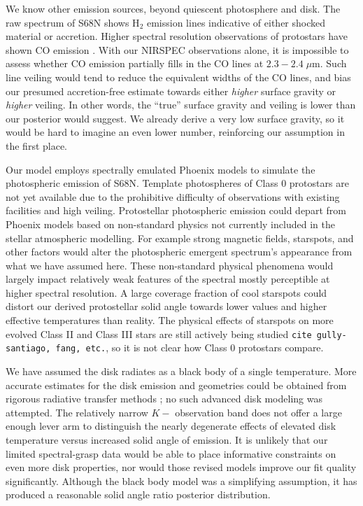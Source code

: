 \documentclass[twocolumn]{emulateapj}%
\begin{document}
We know other emission sources, beyond quiescent photosphere and disk.  The raw spectrum of S68N shows H$_2$ emission lines indicative of either shocked material or accretion.  Higher spectral resolution observations of protostars have shown CO emission \citep{2016ApJ...826..179L}.  With our NIRSPEC observations alone, it is impossible to assess whether CO emission partially fills in the CO lines at $2.3-2.4 \;\mu$m.  Such line veiling would tend to reduce the equivalent widths of the CO lines, and bias our presumed accretion-free estimate towards either \emph{higher} surface gravity or \emph{higher} veiling.  In other words, the ``true'' surface gravity and veiling is lower than our posterior would suggest.  We already derive a very low surface gravity, so it would be hard to imagine an even lower number, reinforcing our assumption in the first place.


Our model employs spectrally emulated Phoenix models to simulate the photospheric emission of S68N.  Template photospheres of Class 0 protostars are not yet available due to the prohibitive difficulty of observations with existing facilities and high veiling.  Protostellar photospheric emission could depart from Phoenix models based on non-standard physics not currently included in the stellar atmospheric modelling.  For example strong magnetic fields, starspots, and other factors would alter the photospheric emergent spectrum's appearance from what we have assumed here.  These non-standard physical phenomena would largely impact relatively weak features of the spectral mostly perceptible at higher spectral resolution.  A large coverage fraction of cool starspots could distort our derived protostellar solid angle towards lower values and higher effective temperatures than reality.  The physical effects of starspots on more evolved Class II and Class III stars are still actively being studied \texttt{cite gully-santiago, fang, etc.}, so it is not clear how Class 0 protostars compare.  

We have assumed the disk radiates as a black body of a single temperature.  More accurate estimates for the disk emission and geometries could be obtained from rigorous radiative transfer methods \citep[][\emph{e.g.}]{2017arXiv170305765R}; no such advanced disk modeling was attempted.  The relatively narrow $K-$ observation band does not offer a large enough lever arm to distinguish the nearly degenerate effects of elevated disk temperature versus increased solid angle of emission.  It is unlikely that our limited spectral-grasp data would be able to place informative constraints on even more disk properties, nor would those revised models improve our fit quality significantly.  Although the black body model was a simplifying assumption, it has produced a reasonable solid angle ratio posterior distribution.
\end{document}
